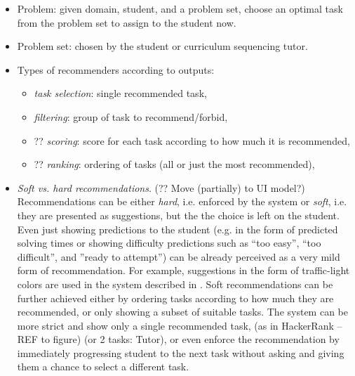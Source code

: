 \begin{itemize}
\item Problem: given domain, student, and a problem set, choose an optimal
  task from the problem set to assign to the student now.
\item Problem set: chosen by the student or curriculum sequencing tutor.

\item Types of recommenders according to outputs:
\begin{itemize}
\item \emph{task selection}: single recommended task,
\item \emph{filtering}: group of task to recommend/forbid,
\item ?? \emph{scoring}: score for each task according to how much it is
recommended,
\item ?? \emph{ranking}: ordering of tasks (all or just the most recommended),
\end{itemize}

\item \emph{Soft vs. hard recommendations}. (?? Move (partially) to UI model?)
Recommendations can be either \emph{hard}, i.e. enforced by the system
or \emph{soft}, i.e. they are presented as suggestions, but the the choice
is left on the student.
Even just showing predictions to the student (e.g. in the form of predicted
solving times or showing difficulty predictions such as
``too easy'', ``too difficult'', and ''ready to attempt'')
can be already perceived as a very mild form of recommendation.
For example, suggestions in the form of traffic-light colors
  are used in the system described in \cite{its-programming}.
Soft recommendations can be further achieved either by
  ordering tasks according to how much they are recommended,
  or only showing a subset of suitable tasks.
The system can be more strict and show only a single recommended task,
  (as in HackerRank -- REF to figure) (or 2 tasks: Tutor),
  or even enforce the recommendation by immediately progressing student to
  the next task without asking and giving them a chance to select a different task.


\end{itemize}
